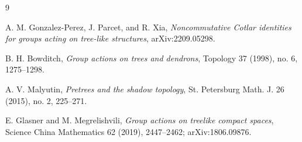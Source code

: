 \documentclass[11pt]{article}
\begin{document}
\begin{thebibliography}{9}

A. M. Gonzalez-Perez, J. Parcet, and R. Xia,
\emph{Noncommutative Cotlar identities for groups acting on tree-like
structures}, arXiv:2209.05298.

B. H. Bowditch,
\emph{Group actions on trees and dendrons},
Topology 37 (1998), no. 6, 1275--1298.

A. V. Malyutin,
\emph{Pretrees and the shadow topology},
St. Petersburg Math. J. 26 (2015), no. 2, 225--271.

E. Glasner and M. Megrelishvili,
\emph{Group actions on treelike compact spaces},
Science China Mathematics 62 (2019), 2447--2462; arXiv:1806.09876.

\end{thebibliography}
\end{document}
